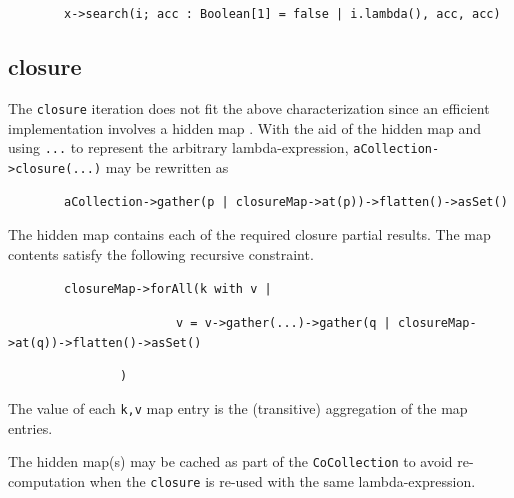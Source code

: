 \documentclass[
]{ceurart}
\begin{document}
\begin{description}[itemsep=-0.2cm]\vspace{-10pt}\small
\item ~~~~~~~~\verb!x->search(i; acc : Boolean[1] = false | i.lambda(), acc, acc)!
\vspace{-10pt}\end{description}

\subsection{closure}

The \verb!closure! iteration does not fit the above characterization since an efficient implementation involves a hidden map \cite{willink2019map}. With the aid of the hidden map and using \verb!...! to represent the arbitrary lambda-expression, \verb!aCollection->closure(...)! may be rewritten as

\begin{description}[itemsep=-0.2cm]\vspace{-10pt}\small
\item ~~~~~~~~\verb!aCollection->gather(p | closureMap->at(p))->flatten()->asSet()!
\vspace{-10pt}\end{description}

The hidden map contains each of the required closure partial results. The map contents satisfy the following recursive constraint.

\begin{description}[itemsep=-0.2cm]\vspace{-10pt}\small\begin{samepage}
\item ~~~~~~~~\verb!closureMap->forAll(k with v |!
\item ~~~~~~~~~~~~~~~~~~~~~~~~\verb!v = v->gather(...)->gather(q | closureMap->at(q))->flatten()->asSet()!
\item ~~~~~~~~~~~~~~~~\verb!)!
\end{samepage}\vspace{-10pt}\end{description}

The value of each \verb!k,v! map entry is the (transitive) aggregation of the map entries. 

The hidden map(s) may be cached as part of the \verb!CoCollection! to avoid re-computation when the \verb!closure! is re-used with the same lambda-expression.
\end{document}
